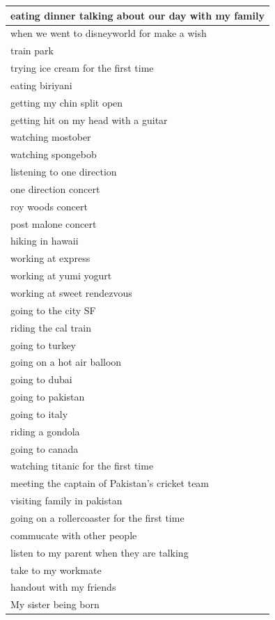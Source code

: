 \documentclass[
  .7em,
  letterpaper,
  DIV=11,
  numbers=noendperiod]{scrartcl}
\begin{document}
\begin{table}
\begin{tabular}{l}
\hline
eating dinner talking about our day with my family\\
\hline
when we went to disneyworld for make a wish\\
\hline
train park\\
\hline
trying ice cream for the first time\\
\hline
eating biriyani\\
\hline
getting my chin split open\\
\hline
getting hit on my head with a guitar\\
\hline
watching mostober\\
\hline
watching spongebob\\
\hline
listening to one direction\\
\hline
one direction concert\\
\hline
roy woods concert\\
\hline
post malone concert\\
\hline
hiking in hawaii\\
\hline
working at express\\
\hline
working at yumi yogurt\\
\hline
working at sweet rendezvous\\
\hline
going to the city SF\\
\hline
riding the cal train\\
\hline
going to turkey\\
\hline
going on a hot air balloon\\
\hline
going to dubai\\
\hline
going to pakistan\\
\hline
going to italy\\
\hline
riding a gondola\\
\hline
going to canada\\
\hline
watching titanic for the first time\\
\hline
meeting the captain of Pakistan's cricket team\\
\hline
visiting family in pakistan\\
\hline
going on a rollercoaster for the first time\\
\hline
commucate with other people\\
\hline
listen to my parent when they are talking\\
\hline
take to my workmate\\
\hline
handout with my friends\\
\hline
My sister being born\\

\end{tabular}
\end{table}
\end{document}
